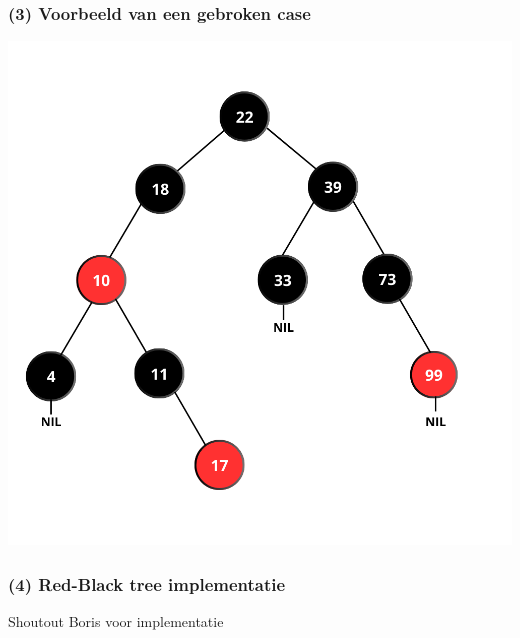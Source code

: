\documentclass[aspectratio=169,sidebar,dyslexic]{uva-inf-presentation}
\begin{document}
\begin{frame}
\frametitle{(3) Voorbeeld van een gebroken case}
    \includegraphics[scale=.30]{DONE.png}
\end{frame}

\begin{frame}
\frametitle{(4) Red-Black tree implementatie}
    Shoutout Boris voor implementatie 
\end{frame}
\end{document}
